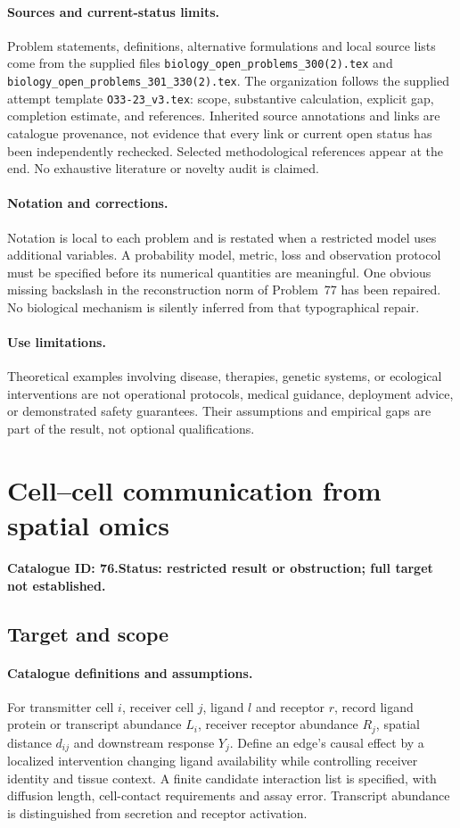 \documentclass[11pt]{article}
\begin{document}
\paragraph{Sources and current-status limits.}
Problem statements, definitions, alternative formulations and local source lists
come from the supplied files
\texttt{biology\_open\_problems\_300(2).tex} and
\texttt{biology\_open\_problems\_301\_330(2).tex}.
The organization follows the supplied attempt template
\texttt{O33-23\_v3.tex}: scope, substantive calculation, explicit gap,
completion estimate, and references. Inherited source annotations and links are
catalogue provenance, not evidence that every link or current open status has
been independently rechecked. Selected methodological references appear at the
end. No exhaustive literature or novelty audit is claimed.

\paragraph{Notation and corrections.}
Notation is local to each problem and is restated when a restricted model uses
additional variables. A probability model, metric, loss and observation protocol
must be specified before its numerical quantities are meaningful. One obvious
missing backslash in the reconstruction norm of Problem~77 has been repaired.
No biological mechanism is silently inferred from that typographical repair.

\paragraph{Use limitations.}
Theoretical examples involving disease, therapies, genetic systems, or ecological
interventions are not operational protocols, medical guidance, deployment advice,
or demonstrated safety guarantees. Their assumptions and empirical gaps are part
of the result, not optional qualifications.

\setcounter{section}{75}
\section{Cell--cell communication from spatial omics}
\label{prob:076}
\noindent\textbf{Catalogue ID: 76.}\quad \textbf{Status: restricted result or obstruction; full target not established.}
\subsection{Target and scope}
\paragraph{Catalogue definitions and assumptions.}
For transmitter cell $i$, receiver cell $j$, ligand $l$ and receptor $r$, record ligand protein or transcript abundance $L_i$, receiver receptor abundance $R_j$, spatial distance $d_{ij}$ and downstream response $Y_j$. Define an edge's causal effect by a localized intervention changing ligand availability while controlling receiver identity and tissue context. A finite candidate interaction list is specified, with diffusion length, cell-contact requirements and assay error. Transcript abundance is distinguished from secretion and receptor activation.
\end{document}
